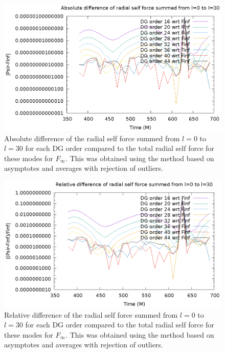 \begin{figure}
\includegraphics{absdiffpsirvtwfinfdgorders}
\caption{Absolute difference of the radial self force summed from $l=0$ to $l=30$  for each DG order compared to the total radial self force for these modes for $F_\infty$. This was obtained using the method based on asymptotes and averages with rejection of outliers.}
\label{absmixed}
\end{figure}

\begin{figure}
\includegraphics{reldiffpsirvtwfinfdgorders}
\caption{Relative difference of the radial self force summed from $l=0$ to $l=30$  for each DG order compared to the total radial self force for these modes for $F_\infty$. This was obtained using the method based on asymptotes and averages with rejection of outliers.}
\label{relmixed}
\end{figure}
